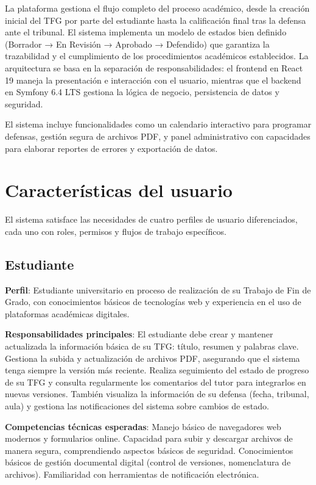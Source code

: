 \documentclass[12pt,a4paper,oneside]{report}
\begin{document}
La plataforma gestiona el flujo completo del proceso académico, desde la
creación inicial del TFG por parte del estudiante hasta la calificación
final tras la defensa ante el tribunal. El sistema implementa un modelo
de estados bien definido (Borrador → En Revisión → Aprobado → Defendido)
que garantiza la trazabilidad y el cumplimiento de los procedimientos
académicos establecidos.
La arquitectura se basa en la separación de responsabilidades: el frontend en React 19 maneja la presentación e interacción con el usuario, mientras que el backend en Symfony 6.4 LTS gestiona la lógica de negocio, persistencia de datos y seguridad.

El sistema incluye funcionalidades como un calendario interactivo para programar defensas, gestión segura de archivos PDF, y panel administrativo con capacidades para elaborar reportes de errores y exportación de datos.

\section{Características del
usuario}\label{caracteruxedsticas-del-usuario}

El sistema satisface las necesidades de cuatro perfiles de usuario diferenciados, cada uno con roles, permisos y flujos de trabajo específicos.

\subsection{Estudiante}\label{estudiante}

\textbf{Perfil}: Estudiante universitario en proceso de realización de
su Trabajo de Fin de Grado, con conocimientos básicos de tecnologías web
y experiencia en el uso de plataformas académicas digitales.

\textbf{Responsabilidades principales}: El estudiante debe crear y mantener actualizada la información básica de su TFG: título, resumen y palabras clave. Gestiona la subida y actualización de archivos PDF, asegurando que el sistema tenga siempre la versión más reciente. Realiza seguimiento del estado de progreso de su TFG y consulta regularmente los comentarios del tutor para integrarlos en nuevas versiones. También visualiza la información de su defensa (fecha, tribunal, aula) y gestiona las notificaciones del sistema sobre cambios de estado.

\textbf{Competencias técnicas esperadas}: Manejo básico de navegadores web modernos y formularios online. Capacidad para subir y descargar archivos de manera segura, comprendiendo aspectos básicos de seguridad. Conocimientos básicos de gestión documental digital (control de versiones, nomenclatura de archivos). Familiaridad con herramientas de notificación electrónica.
\end{document}
